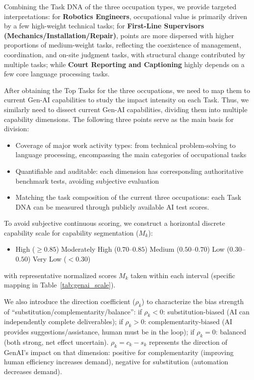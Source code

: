 Combining the Task DNA of the three occupation types, we provide targeted interpretations: for \textbf{Robotics Engineers}, occupational value is primarily driven by a few high-weight technical tasks; for \textbf{First-Line Supervisors (Mechanics/Installation/Repair)}, points are more dispersed with higher proportions of medium-weight tasks, reflecting the coexistence of management, coordination, and on-site judgment tasks, with structural change contributed by multiple tasks; while \textbf{Court Reporting and Captioning} highly depends on a few core language processing tasks.

After obtaining the Top Tasks for the three occupations, we need to map them to current Gen-AI capabilities to study the impact intensity on each Task. Thus, we similarly need to dissect current Gen-AI capabilities, dividing them into multiple capability dimensions. The following three points serve as the main basis for division:

\begin{itemize}
    \item Coverage of major work activity types: from technical problem-solving to language processing, encompassing the main categories of occupational tasks
    \item Quantifiable and auditable: each dimension has corresponding authoritative benchmark tests, avoiding subjective evaluation
    \item Matching the task composition of the current three occupations: each Task DNA can be measured through publicly available AI test scores.
\end{itemize}

To avoid subjective continuous scoring, we construct a horizontal discrete capability scale for capability segmentation ($M_k$):
\begin{itemize}[label={},leftmargin=*]
    \item[] High ($\ge 0.85$)\quad
    Moderately High ($0.70$--$0.85$)\quad
    Medium ($0.50$--$0.70$)\quad
    Low ($0.30$--$0.50$)\quad
    Very Low ($<0.30$)
\end{itemize}
with representative normalized scores $M_k$ taken within each interval (specific mapping in Table~\ref{tab:genai_scale}).

We also introduce the {direction coefficient ($\rho_k$)} to characterize the bias strength of ``substitution/complementarity/balance'': if
$\rho_k<0$: substitution-biased (AI can independently complete deliverables);
if $\rho_k>0$: complementarity-biased (AI provides suggestions/assistance, human must be in the loop);
if $\rho_k=0$: balanced (both strong, net effect uncertain).
$\rho_k = c_k - s_k$ represents the direction of GenAI's impact on that dimension: positive for complementarity (improving human efficiency increases demand), negative for substitution (automation decreases demand).

